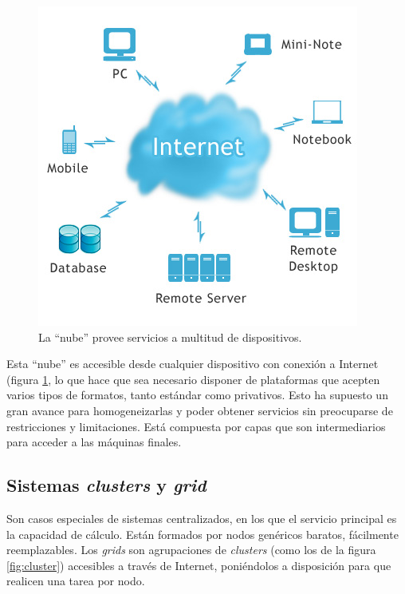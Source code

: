 \begin{figure}[h]
	\centering
	\includegraphics[scale=0.6]{images/cloudComputing.png}
	\caption[La ``nube'']{La ``nube'' provee servicios a multitud de dispositivos.}
	\label{fig:cloudcomputing}
\end{figure}

Esta ``nube'' es accesible desde cualquier dispositivo con conexión a 
Internet (figura \ref{fig:cloudcomputing}, lo que hace que sea 
necesario disponer de plataformas que 
acepten varios tipos de formatos, tanto estándar como privativos. Esto 
ha supuesto un gran avance para homogeneizarlas y poder obtener 
servicios sin preocuparse de restricciones y limitaciones. Está 
compuesta por capas que son intermediarios para acceder a las máquinas 
finales.

\subsection{Sistemas \emph{clusters} y \emph{grid}}
Son casos especiales de sistemas centralizados, en los que el servicio 
principal es la capacidad de cálculo. Están formados por nodos 
genéricos baratos, fácilmente reemplazables. Los \emph{grids} son 
agrupaciones de \emph{clusters} (como los de la figura 
\ref{fig:cluster}) accesibles a través de Internet, 
poniéndolos a disposición para que realicen una tarea por nodo.

